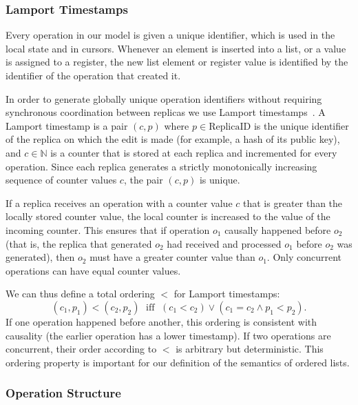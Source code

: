 \documentclass[10pt,journal,compsoc]{IEEEtran}
\begin{document}
\subsubsection{Lamport Timestamps}\label{sec:lamport-ts}

Every operation in our model is given a unique identifier, which is used in the local state and in cursors. Whenever an element is inserted into a list, or a value is assigned to a register, the new list element or register value is identified by the identifier of the operation that created it.

In order to generate globally unique operation identifiers without requiring synchronous coordination between replicas we use Lamport timestamps~\cite{Lamport:1978jq}. A Lamport timestamp is a pair $(c, p)$ where $p \in \mathrm{ReplicaID}$ is the unique identifier of the replica on which the edit is made (for example, a hash of its public key), and $c \in \mathbb{N}$ is a counter that is stored at each replica and incremented for every operation. Since each replica generates a strictly monotonically increasing sequence of counter values $c$, the pair $(c, p)$ is unique.

If a replica receives an operation with a counter value $c$ that is greater than the locally stored counter value, the local counter is increased to the value of the incoming counter. This ensures that if operation $o_1$ causally happened before $o_2$ (that is, the replica that generated $o_2$ had received and processed $o_1$ before $o_2$ was generated), then $o_2$ must have a greater counter value than $o_1$. Only concurrent operations can have equal counter values.

We can thus define a total ordering $<$ for Lamport timestamps:
\[ (c_1, p_1) < (c_2, p_2) \;\text{ iff }\; (c_1 < c_2) \vee (c_1 = c_2 \wedge p_1 < p_2). \]
If one operation happened before another, this ordering is consistent with causality (the earlier operation has a lower timestamp). If two operations are concurrent, their order according to $<$ is arbitrary but deterministic. This ordering property is important for our definition of the semantics of ordered lists.

\subsubsection{Operation Structure}
\end{document}
